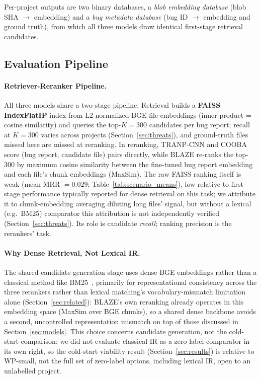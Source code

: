 \documentclass[a4paper,fleqn]{cas-dc}
\begin{document}
Per-project outputs are two binary databases, a \emph{blob embedding
database} (blob SHA $\to$ embedding) and a \emph{bug metadata database}
(bug ID $\to$ embedding and ground truth), from which all three models
draw identical first-stage retrieval candidates.

\subsection{Evaluation Pipeline}
\label{sec:pipeline}

\paragraph{Retriever-Reranker Pipeline.}
All three models share a two-stage pipeline. Retrieval builds a
\textbf{FAISS IndexFlatIP} index from L2-normalized BGE file embeddings
(inner product = cosine similarity) and queries the top-$K = 300$
candidates per bug report; recall at $K=300$ varies across projects
(Section~\ref{sec:threats}), and ground-truth files missed here are missed
at reranking. In reranking, TRANP-CNN and COOBA score (bug report,
candidate file) pairs directly, while BLAZE re-ranks the top-300 by maximum
cosine similarity between the fine-tuned bug report embedding and each
file's chunk embeddings (MaxSim). The raw FAISS ranking itself is weak
(mean MRR $= 0.029$; Table~\ref{tab:scenario_means}), low relative to
first-stage performance typically reported for dense retrieval on this
task; we attribute it to chunk-embedding averaging diluting long files'
signal, but without a lexical (e.g.\ BM25) comparator this attribution is
not independently verified (Section~\ref{sec:threats}). Its role is
candidate \emph{recall}; ranking precision is the rerankers' task.

\paragraph{Why Dense Retrieval, Not Lexical IR.}
The shared candidate-generation stage uses dense BGE embeddings rather than
a classical method like BM25~\citep{robertson2009probabilistic}, primarily
for representational consistency across the three rerankers rather than
lexical matching's vocabulary-mismatch limitation alone
(Section~\ref{sec:related}): BLAZE's own reranking already operates in this
embedding space (MaxSim over BGE chunks), so a shared dense backbone avoids
a second, uncontrolled representation mismatch on top of those discussed in
Section~\ref{sec:models}. This choice concerns candidate generation, not the cold-start
comparison: we did not evaluate classical IR as a zero-label comparator in
its own right, so the cold-start viability result
(Section~\ref{sec:results}) is relative to WP-small, not the full set of
zero-label options, including lexical IR, open to an unlabelled
project.
\end{document}
